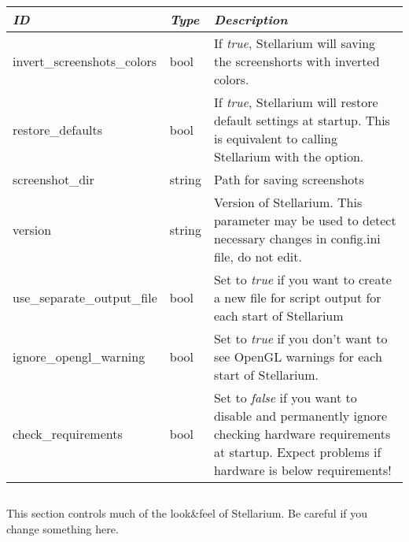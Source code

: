 \begin{longtabu} to \textwidth {l|l|X}\toprule
\emph{ID}                 & \emph{Type} & \emph{Description}\\\midrule
invert\_screenshots\_colors & bool & If \emph{true}, Stellarium will saving the screenshorts with inverted colors.\\\midrule
restore\_defaults           & bool & If \emph{true}, Stellarium will restore default settings at startup. 
                                     This is equivalent to calling Stellarium with the  option.\\\midrule
screenshot\_dir             & string & Path for saving screenshots\\\midrule
version                     & string & Version of Stellarium. This parameter may be used to detect necessary changes in config.ini file, do not edit.\\\midrule
use\_separate\_output\_file & bool   & Set to \emph{true} if you want to create a new file for script output for each start of Stellarium\\\midrule
ignore\_opengl\_warning     & bool   & Set to \emph{true} if you don't want to see OpenGL warnings for each start of Stellarium.\\\midrule
check\_requirements         & bool   & Set to \emph{false} if you want to disable and permanently ignore checking hardware requirements at startup. 
                                       Expect problems if hardware is below requirements!\\
\bottomrule
\end{longtabu}

\subsection{}\label{sec:config.ini:navigation}

This section controls much of the look\&feel of Stellarium. Be careful if you change something here.


